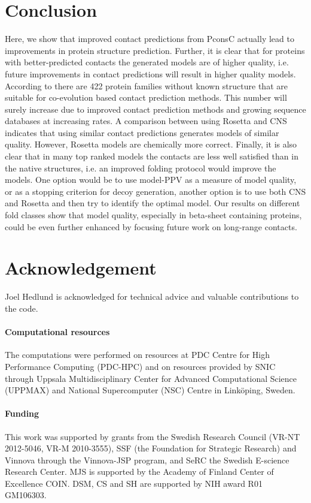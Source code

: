\documentclass{bioinfo}
\begin{document}
\section{Conclusion}

Here, we show that improved contact predictions from PconsC
\cite[]{skwark_PconsC:_2013} actually lead to improvements in protein
structure prediction. Further, it is clear that for proteins with
better-predicted contacts the generated models are of higher quality,
i.e. future improvements in contact predictions will result in higher
quality models. {\color{red}According to
\cite{kamisetty_assessing_2013} there are 422 protein families
without known structure that are suitable for co-evolution based
contact prediction methods. This number will surely increase due
to improved contact prediction methods and growing sequence
databases at increasing rates.} A comparison between using Rosetta and
CNS indicates that using similar contact predictions generates models
of similar quality. However, Rosetta models are chemically more
correct. Finally, it is also clear that in many top ranked models the
contacts are less well satisfied than in the native structures, i.e.
an improved folding protocol would improve the models. One option
would be to use model-PPV as a measure of model quality, or as a
stopping criterion for decoy generation, another option is to use both
CNS and Rosetta and then try to identify the optimal model.
{\color{red}Our results on different fold classes show that model
quality, especially in beta-sheet containing proteins, could be
even further enhanced by focusing future work on long-range
contacts.}



\section*{Acknowledgement}
Joel Hedlund is acknowledged for technical advice and valuable contributions to the code. 

\paragraph{Computational resources\textcolon}
The computations were performed on resources at PDC Centre for High
Performance Computing (PDC-HPC) and on resources provided by SNIC
through Uppsala Multidisciplinary Center for Advanced Computational
Science (UPPMAX) and National Supercomputer (NSC) Centre in Link\"oping,
Sweden.

\paragraph{Funding\textcolon} This work was supported by grants from
the Swedish Research Council (VR-NT 2012-5046, VR-M 2010-3555), SSF
(the Foundation for Strategic Research) and Vinnova through the
Vinnova-JSP program, and SeRC the Swedish E-science Research Center.
MJS is supported by the Academy of Finland Center of Excellence COIN.
DSM, CS and SH are supported by NIH award R01 GM106303.


%
%
%
%
%
%
%

\end{document}
